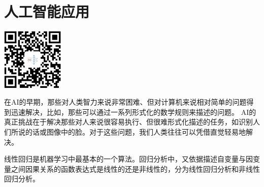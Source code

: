 \part{人工智能应用}
\label{part:ai_learning}

\newpage

\begin{center}{\includegraphics[width=3cm]{barcode.png}}\end{center}\par

在\gls{AI}的早期，那些对人类智力来说非常困难、但对计算机来说相对简单的问题得到迅速解决，比如，那些可以通过一系列形式化的数学规则来描述的问题。
\gls{AI}的真正挑战在于解决那些对人来说很容易执行、但很难形式化描述的任务，如识别人们所说的话或图像中的脸。对于这些问题，我们人类往往可以凭借直觉轻易地解决。

线性回归是机器学习中最基本的一个算法。回归分析中，又依据描述自变量与因变量之间因果关系的函数表达式是线性的还是非线性的，分为线性回归分析和非线性回归分析。


